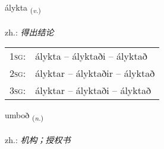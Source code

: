 \documentclass[frontgrid, backgrid]{flacards}\usepackage[]{graphicx}\usepackage[]{xcolor}
\begin{document}
\renewcommand{\flhead}{\vskip5pt \fboxsep=0pt {\small\bfseries\footnotesize Sagnorð | 动词}}
\renewcommand{\fcfoot}{\vskip5pt \fboxsep=0pt \hspace{2pt}{\small\bfseries\footnotesize 3K}}

\renewcommand{\blhead}{\vskip5pt {\small\bfseries\footnotesize Sagnorð | 动词 }}
\renewcommand{\bcfoot}{\vskip5pt \hspace{2pt}{\small\bfseries\footnotesize 3K}}


{álykta \small{\textsubscript{(\textit{v.})}} \\[1ex] %
\textphonetic{[auːlɪxta]} \\
zh.: \emph{得出结论} \\  [2ex]
\renewcommand*{\arraystretch}{0.8}
\begin{tabular}{p{1cm}l}
\textsc{1sg}: & álykta -- ályktaði -- ályktað \\ 
\textsc{2sg}: & ályktar -- ályktaðir -- ályktað \\ 
\textsc{3sg}: & ályktar -- ályktaði -- ályktað \\ 
\end{tabular}
}

\renewcommand{\flhead}{\vskip5pt \fboxsep=0pt {\small\bfseries\footnotesize Nafnorð | 名词}}
\renewcommand{\fcfoot}{\vskip5pt \fboxsep=0pt \hspace{2pt}{\small\bfseries\footnotesize 3K}}

\renewcommand{\blhead}{\vskip5pt {\small\bfseries\footnotesize Nafnorð | 名词 }}
\renewcommand{\bcfoot}{\vskip5pt \hspace{2pt}{\small\bfseries\footnotesize 3K}}


{umboð \small{\textsubscript{(\textit{n.})}} \\[1ex] %
\textphonetic{[ʏmpɔð]} \\
zh.: \emph{机构；授权书} \\  [2ex]
\renewcommand*{\arraystretch}{0.8}
}
\end{document}
